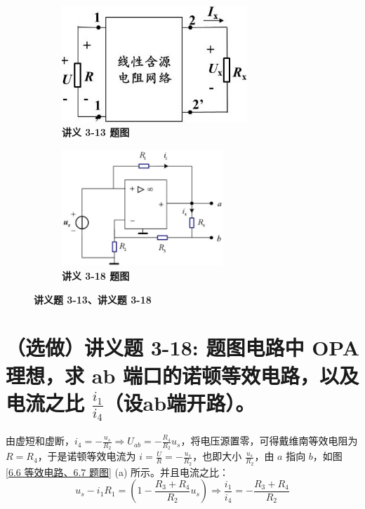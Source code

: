 \documentclass[UTF8]{report}
\theoremstyle{MyLineTheoremStyle} %
\theoremstyle{MyBlockTheoremStyle} %
\theoremstyle{MySubsubsectionStyle} %
\begin{document}
\begin{figure}[H]\centering
\begin{subfigure}[t]{0.45\columnwidth}\centering
    \includegraphics[height=125pt]{assets/6/image (9).jpg}
    \caption{\bfseries 讲义 3-13 题图 }
\end{subfigure}\hfill
\begin{subfigure}[t]{0.55\columnwidth}\centering
    \includegraphics[height=125pt]{assets/6/image (10).jpg}
    \caption{\bfseries 讲义 3-18 题图 }
\end{subfigure}
\caption{\bfseries 讲义题 3-13、讲义题 3-18 }
\end{figure}

\section{（选做）讲义题 3-18: 题图电路中 OPA 理想，求 ab 端口的诺顿等效电路，以及电流之比 $\frac{i_1}{i_4}$（设ab端开路）。}

由虚短和虚断，$i_4 = - \frac{u_s}{R_2} \Longrightarrow U_{ab} = -\frac{R_4}{R_2}u_s$，将电压源置零，可得戴维南等效电阻为 $R = R_4$，于是诺顿等效电流为 $i = \frac{U}{R} = - \frac{u_s}{R_2}$，也即大小 $\frac{u_s}{R_2}$，由 $a$ 指向 $b$，如图 \ref{6.6 等效电路、6.7 题图} (a) 所示。并且电流之比：
\begin{equation}
u_s - i_1R_1 = \left(1 - \frac{R_3 + R_4}{R_2}u_s\right) \Longrightarrow  \boxed{
    \frac{i_1}{i_4} = - \frac{R_3 + R_4}{R_2}
}
\end{equation}
\end{document}
